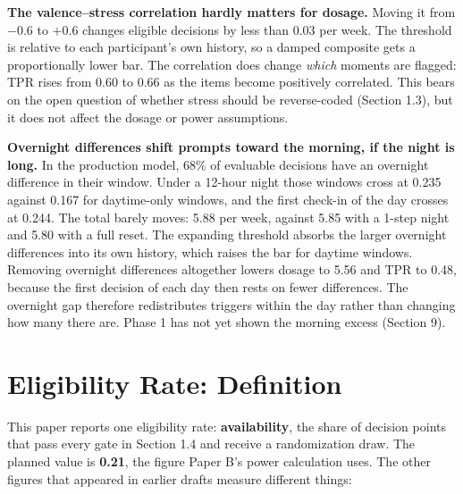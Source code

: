 \documentclass[11pt,letterpaper]{article}
\begin{document}
\textbf{The valence--stress correlation hardly matters for dosage.} Moving it from $-0.6$ to $+0.6$ changes eligible decisions by less than 0.03 per week. The threshold is relative to each participant's own history, so a damped composite gets a proportionally lower bar. The correlation does change \emph{which} moments are flagged: TPR rises from 0.60 to 0.66 as the items become positively correlated. This bears on the open question of whether stress should be reverse-coded (Section 1.3), but it does not affect the dosage or power assumptions.

\textbf{Overnight differences shift prompts toward the morning, if the night is long.} In the production model, 68\% of evaluable decisions have an overnight difference in their window. Under a 12-hour night those windows cross at 0.235 against 0.167 for daytime-only windows, and the first check-in of the day crosses at 0.244. The total barely moves: 5.88 per week, against 5.85 with a 1-step night and 5.80 with a full reset. The expanding threshold absorbs the larger overnight differences into its own history, which raises the bar for daytime windows. Removing overnight differences altogether lowers dosage to 5.56 and TPR to 0.48, because the first decision of each day then rests on fewer differences. The overnight gap therefore redistributes triggers within the day rather than changing how many there are. Phase 1 has not yet shown the morning excess (Section 9).

\section{Eligibility Rate: Definition}

This paper reports one eligibility rate: \textbf{availability}, the share of decision points that pass every gate in Section 1.4 and receive a randomization draw. The planned value is \textbf{0.21}, the figure Paper B's power calculation uses. The other figures that appeared in earlier drafts measure different things:
\end{document}
